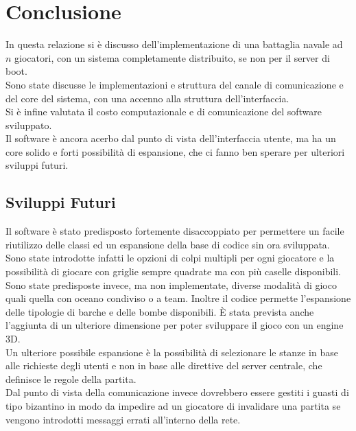 \documentclass{llncs}
\begin{document}
\section{Conclusione}
In questa relazione si è discusso dell'implementazione di una battaglia navale ad $n$ giocatori, con un sistema completamente distribuito, se non per il server di boot.\\
Sono state discusse le implementazioni e struttura del canale di comunicazione e del core del sistema, con una accenno alla struttura dell'interfaccia.\\
Si è infine valutata il costo computazionale e di comunicazione del software sviluppato.\\
Il software è ancora acerbo dal punto di vista dell'interfaccia utente, ma ha un core solido e forti possibilità di espansione, che ci fanno ben sperare per ulteriori sviluppi futuri.
\subsection{Sviluppi Futuri}
Il software è stato predisposto fortemente disaccoppiato per permettere un facile riutilizzo delle classi ed un espansione della base di codice sin ora sviluppata.\\
Sono state introdotte infatti le opzioni di colpi multipli per ogni giocatore e la possibilità di giocare con griglie sempre quadrate ma con più caselle disponibili.\\
Sono state predisposte invece, ma non implementate, diverse modalità di gioco quali quella con oceano condiviso o a team. Inoltre il codice permette l'espansione delle tipologie di barche e delle bombe disponibili. È stata prevista anche l'aggiunta di un ulteriore dimensione per poter sviluppare il gioco con un engine 3D.\\
Un ulteriore possibile espansione è la possibilità di selezionare le stanze in base alle richieste degli utenti e non in base alle direttive del server centrale, che definisce le regole della partita.\\
Dal punto di vista della comunicazione invece dovrebbero essere gestiti i guasti di tipo bizantino in modo da impedire ad un giocatore di invalidare una partita se vengono introdotti messaggi errati all'interno della rete.
%
\end{document}
